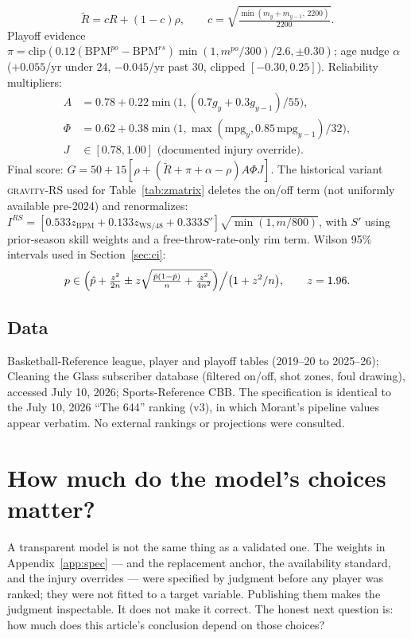 \documentclass[11pt]{article}
\newcommand{\gravity}{\textsc{gravity}}
\begin{document}
\begin{equation}
\tilde{R} = cR + (1{-}c)\rho, \qquad c = \sqrt{\tfrac{\min(m_y + m_{y-1},\, 2200)}{2200}}.
\label{eq:cred}
\end{equation}
Playoff evidence $\pi = \mathrm{clip}(0.12(\mathrm{BPM}^{po}{-}\mathrm{BPM}^{rs})
\min(1, m^{po}/300)/2.6, \pm 0.30)$; age nudge $\alpha$ ($+0.055$/yr under 24,
$-0.045$/yr past 30, clipped $[-0.30, 0.25]$). Reliability multipliers:
\begin{align}
A &= 0.78 + 0.22 \min\bigl(1, (0.7 g_y + 0.3 g_{y-1})/55\bigr), \label{eq:avail}\\
\Phi &= 0.62 + 0.38 \min\bigl(1, \max(\mathrm{mpg}_y, 0.85\,\mathrm{mpg}_{y-1})/32\bigr), \label{eq:role}\\
J &\in [0.78, 1.00] \text{ (documented injury override).} \label{eq:inj}
\end{align}
Final score: $G = 50 + 15[\rho + (\tilde{R} + \pi + \alpha - \rho) A \Phi J]$. The
historical variant \gravity-RS used for Table~\ref{tab:zmatrix} deletes the on/off term
(not uniformly available pre-2024) and renormalizes: $I^{RS} = [0.533 z_{\mathrm{BPM}} +
0.133 z_{\mathrm{WS/48}} + 0.333 S']\sqrt{\min(1, m/800)}$, with $S'$ using prior-season
skill weights and a free-throw-rate-only rim term. Wilson 95\% intervals used in
Section~\ref{sec:ci}:
\begin{equation}
p \in \Bigl(\hat{p} + \tfrac{z^2}{2n} \pm z\sqrt{\tfrac{\hat{p}(1-\hat{p})}{n}
+ \tfrac{z^2}{4n^2}}\Bigr)\Big/\bigl(1 + z^2/n\bigr), \qquad z = 1.96.
\label{eq:wilson}
\end{equation}

\subsection*{Data}
Basketball-Reference league, player and playoff tables (2019--20 to 2025--26);
Cleaning the Glass subscriber database (filtered on/off, shot zones, foul drawing),
accessed July 10, 2026; Sports-Reference CBB. The specification is identical to the
July 10, 2026 ``The 644'' ranking (v3), in which Morant's pipeline values appear
verbatim. No external rankings or projections were consulted.

\section{How much do the model's choices matter?}
\label{app:sens}

A transparent model is not the same thing as a validated one. The weights in
Appendix~\ref{app:spec} --- and the replacement anchor, the availability standard, and
the injury overrides --- were specified by judgment before any player was ranked; they
were not fitted to a target variable. Publishing them makes the judgment inspectable.
It does not make it correct. The honest next question is: how much does this article's
conclusion depend on those choices?
\end{document}
